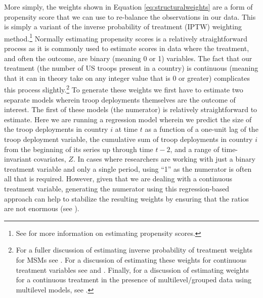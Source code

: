 More simply, the weights shown in Equation \ref{eq:structuralweights} are a form of propensity score that we can use to re-balance the observations in our data. This is simply a variant of the inverse probability of treatment (IPTW) weighting method.\footnote{See  for more information on estimating propensity scores.} Normally estimating propensity scores is a relatively straightforward process as it is commonly used to estimate scores in data where the treatment, and often the outcome, are binary (meaning 0 or 1) variables. The fact that our treatment (the number of US troops present in a country) is continuous (meaning that it can in theory take on any integer value that is 0 or greater) complicates this process slightly.\footnote{For a fuller discussion of estimating inverse probability of treatment weights for MSMs see . For a discussion of estimating these weights for continuous treatment variables see  and . Finally, for a discussion of estimating weights for a continuous treatment in the presence of multilevel/grouped data using multilevel models, see .} To generate these weights we first have to estimate two separate models wherein troop deployments themselves are the outcome of interest. The first of these models (the numerator) is relatively straightforward to estimate. Here we are running a regression model wherein we predict the size of the troop deployments in country $i$ at time $t$ as a function of a one-unit lag of the troop deployment variable, the cumulative sum of troop deployments in country $i$ from the beginning of its series up through time $t-2$, and a range of time-invariant covariates, $Z$. In cases where researchers are working with just a binary treatment variable and only a single period, using ``1'' as the numerator is often all that is required. However, given that we are dealing with a continuous treatment variable, generating the numerator using this regression-based approach can help to stabilize the resulting weights by ensuring that the ratios are not enormous (see ).

